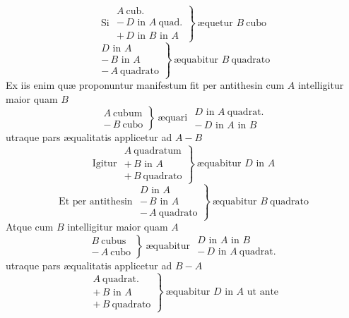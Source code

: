 \documentclass[11pt,a4paper]{article}
\begin{document}
\[ \text{Si } \left.\begin{array}{l} A\ \text{cub.} \\ -\,D \text{ in } A\ \text{quad.} \\ +\,D \text{ in } B \text{ in } A \end{array}\right\}\ \text{æquetur } B\ \text{cubo} \]
\[ \left.\begin{array}{l} D \text{ in } A \\ -\,B \text{ in } A \\ -\,A\ \text{quadrato} \end{array}\right\}\ \text{æquabitur } B\ \text{quadrato} \]
Ex iis enim quæ proponuntur manifestum fit per antithesin cum $A$ intelligitur maior quam $B$
\[ \left.\begin{array}{l} A\ \text{cubum} \\ -\,B\ \text{cubo} \end{array}\right\}\ \text{æquari } \begin{array}{l} D \text{ in } A\ \text{quadrat.} \\ -\,D \text{ in } A \text{ in } B \end{array} \]
utraque pars æqualitatis applicetur ad $A - B$
\[ \text{Igitur } \left.\begin{array}{l} A\ \text{quadratum} \\ +\,B \text{ in } A \\ +\,B\ \text{quadrato} \end{array}\right\}\ \text{æquabitur } D \text{ in } A \]
\[ \text{Et per antithesin } \left.\begin{array}{l} D \text{ in } A \\ -\,B \text{ in } A \\ -\,A\ \text{quadrato} \end{array}\right\}\ \text{æquabitur } B\ \text{quadrato} \]
Atque cum $B$ intelligitur maior quam $A$
\[ \left.\begin{array}{l} B\ \text{cubus} \\ -\,A\ \text{cubo} \end{array}\right\}\ \text{æquabitur } \begin{array}{l} D \text{ in } A \text{ in } B \\ -\,D \text{ in } A\ \text{quadrat.} \end{array} \]
utraque pars æqualitatis applicetur ad $B - A$
\[ \left.\begin{array}{l} A\ \text{quadrat.} \\ +\,B \text{ in } A \\ +\,B\ \text{quadrato} \end{array}\right\}\ \text{æquabitur } D \text{ in } A \text{ ut ante} \]
\end{document}

